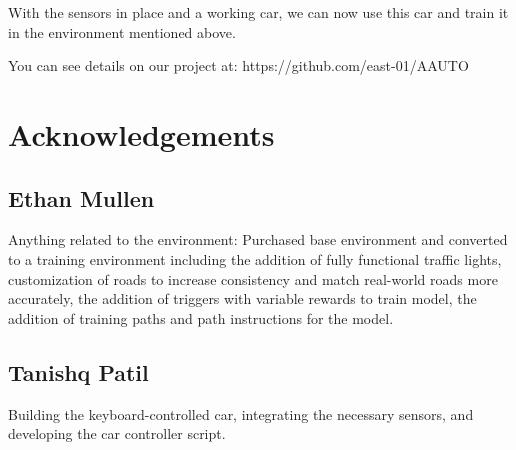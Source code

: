 \documentclass[conference]{IEEEtran}
\begin{document}
With the sensors in place and a working car, we can now use this car and train it in the environment mentioned above.




\par
You can see details on our project at: https://github.com/east-01/AAUTO

\section{Acknowledgements}
\subsection{Ethan Mullen}
Anything related to the environment: Purchased base environment and converted to a training environment including the addition of fully functional traffic lights, customization of roads to increase consistency and match real-world roads more accurately, the addition of triggers with variable rewards to train model, the addition of training paths and path instructions for the model.
\subsection{Tanishq Patil}
Building the keyboard-controlled car, integrating the necessary sensors, and developing the car controller script.


\end{document}
